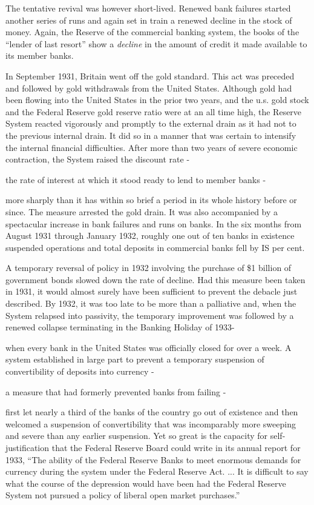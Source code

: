 \documentclass[11pt,openany]{book}
\begin{document}
The tentative revival was however short-lived. Renewed bank failures started another series of runs and again set in train a renewed decline in the stock of money. Again, the Reserve of the commercial banking system, the books of the ``lender of last resort'' show a \emph{decline} in the amount of credit it made available to its member banks.

In September 1931, Britain went off the gold standard. This act was preceded and followed by gold withdrawals from the United States. Although gold had been flowing into the United States in the prior two years, and the u.s. gold stock and the Federal Reserve gold reserve ratio were at an all time high, the Reserve System reacted vigorously and promptly to the external drain as it had not to the previous internal drain. It did so in a manner that was certain to intensify the internal financial difficulties. After more than two years of severe economic contraction, the System raised the discount rate -

the rate of interest at which it stood ready to lend to member banks -

more sharply than it has within so brief a period in its whole history before or since. The measure arrested the gold drain. It was also accompanied by a spectacular increase in bank failures and runs on banks. In the six months from August 1931 through January 1932, roughly one out of ten banks in existence suspended operations and total deposits in commercial banks fell by IS per cent.

A temporary reversal of policy in 1932 involving the purchase of \$1 billion of government bonds slowed down the rate of decline. Had this measure been taken in 1931, it would almost surely have been sufficient to prevent the debacle just described. By 1932, it was too late to be more than a palliative and, when the System relapsed into passivity, the temporary improvement was followed by a renewed collapse terminating in the Banking Holiday of 1933-

when every bank in the United States was officially closed for over a week. A system established in large part to prevent a temporary suspension of convertibility of deposits into currency -

a measure that had formerly prevented banks from failing -

first let nearly a third of the banks of the country go out of existence and then welcomed a suspension of convertibility that was incomparably more sweeping and severe than any earlier suspension. Yet so great is the capacity for self-justification that the Federal Reserve Board could write in its annual report for 1933, ``The ability of the Federal Reserve Banks to meet enormous demands for currency during the system under the Federal Reserve Act. ... It is difficult to say what the course of the depression would have been had the Federal Reserve System not pursued a policy of liberal open market purchases.''
\end{document}
